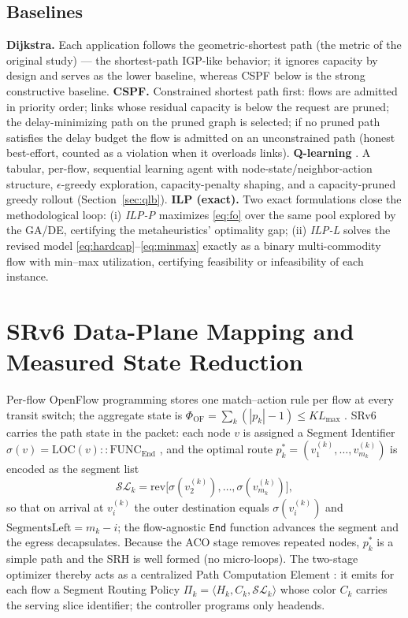 \documentclass[journal]{IEEEtran}
\begin{document}
\subsection{Baselines}
\textbf{Dijkstra.} Each application follows the geometric-shortest path
(the metric of the original study) --- the shortest-path IGP-like behavior;
it ignores capacity by design and serves as the lower baseline, whereas CSPF
below is the strong constructive baseline.
\textbf{CSPF.} Constrained shortest path first: flows are admitted in
priority order; links whose residual capacity is below the request are
pruned; the delay-minimizing path on the pruned graph is selected; if no
pruned path satisfies the delay budget the flow is admitted on an
unconstrained path (honest best-effort, counted as a violation when it
overloads links).
\textbf{Q-learning} \cite{watkins1992}. A tabular, per-flow, sequential learning agent with
node-state/neighbor-action structure, $\epsilon$-greedy exploration,
capacity-penalty shaping, and a capacity-pruned greedy rollout
(Section~\ref{sec:qlb}).
\textbf{ILP (exact).} Two exact formulations close the methodological loop:
(i) \emph{ILP-P} maximizes \eqref{eq:fo} over the same pool explored by the
GA/DE, certifying the metaheuristics' optimality gap; (ii) \emph{ILP-L}
solves the revised model \eqref{eq:hardcap}--\eqref{eq:minmax} exactly as a
binary multi-commodity flow with min--max utilization, certifying
feasibility or infeasibility of each instance.

\section{SRv6 Data-Plane Mapping and Measured State Reduction}
\label{sec:srv6}
Per-flow OpenFlow programming stores one match--action rule per flow at
every transit switch; the aggregate state is
$\Phi_{\mathrm{OF}}=\sum_{k}(|p_k|-1)\le K L_{\max}$
\cite{mckeown2008}. SRv6 \cite{rfc8402,rfc8754,rfc8986} carries the path
state in the packet: each node $v$ is assigned a Segment Identifier
$\sigma(v)=\mathrm{LOC}(v){:}{:}\mathrm{FUNC}_{\mathrm{End}}$
\cite{rfc8986}, and the optimal route
$p^{*}_k=(v^{(k)}_1,\ldots,v^{(k)}_{m_k})$ is encoded as the segment list
\begin{equation}
\mathcal{SL}_k=\mathrm{rev}\bigl[\sigma(v^{(k)}_2),\ldots,
\sigma(v^{(k)}_{m_k})\bigr],
\label{eq:seglist}
\end{equation}
so that on arrival at $v^{(k)}_i$ the outer destination equals
$\sigma(v^{(k)}_i)$ and $\mathrm{SegmentsLeft}=m_k-i$; the flow-agnostic
\texttt{End} function advances the segment and the egress decapsulates.
Because the ACO stage removes repeated nodes, $p^{*}_k$ is a simple path and
the SRH is well formed (no micro-loops). The two-stage optimizer thereby acts
as a centralized Path Computation Element \cite{rfc4655}: it emits for each
flow a Segment Routing Policy $\Pi_k=\langle H_k, C_k, \mathcal{SL}_k\rangle$
\cite{rfc9256} whose color $C_k$ carries the serving slice identifier; the
controller programs only headends.
\end{document}
